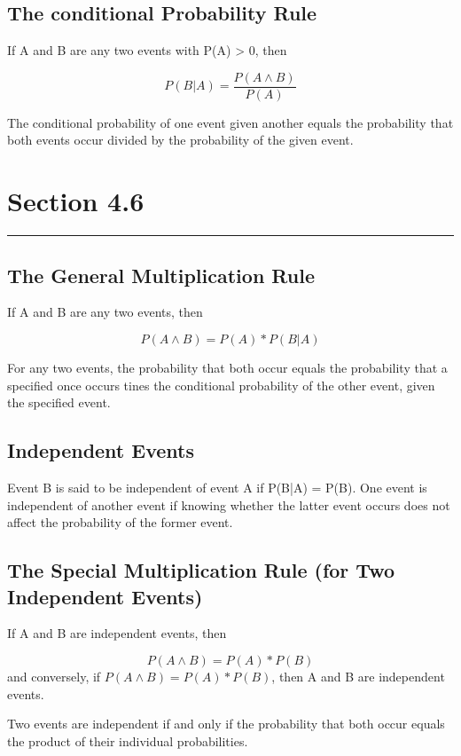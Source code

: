 \documentclass[12pt]{article}
\begin{document}
        \subsection*{The conditional Probability Rule}
            If A and B are any two events with P(A) > 0, then
            \begin{center}
                \[
                P(B|A) = \frac{P(A \wedge B)}{P(A)}
                \]
            \end{center}
            The conditional probability of one event given another equals the probability that both 
            events occur divided by the probability of the given event.
    \section*{Section 4.6}
    \noindent\rule{\textwidth}{0.4pt}
        \subsection*{The General Multiplication Rule}
            If A and B are any two events, then 
            \begin{center}
                \[
                    P(A \wedge B) = P(A) * P(B|A)
                \]
            \end{center}
            For any two events, the probability that both occur equals the probability that a specified
            once occurs tines the conditional probability of the other event, given the specified event.         
        \subsection*{Independent Events}
            Event B is said to be independent of event A if P(B|A) = P(B). One event is independent of 
            another event if knowing whether the latter event occurs
            does not affect the probability of the former event.
        \subsection*{The Special Multiplication Rule (for Two Independent Events)}
            If A and B are independent events, then
            \begin{center}
                \[
                    P(A \wedge B) = P(A) * P(B)    
                \]
                and conversely, if $P(A \wedge B) = P(A) * P(B)$, then A and B are independent events. 
            \end{center}
            Two events are independent if and only if the probability that both occur equals the product
            of their individual probabilities.
\end{document}
